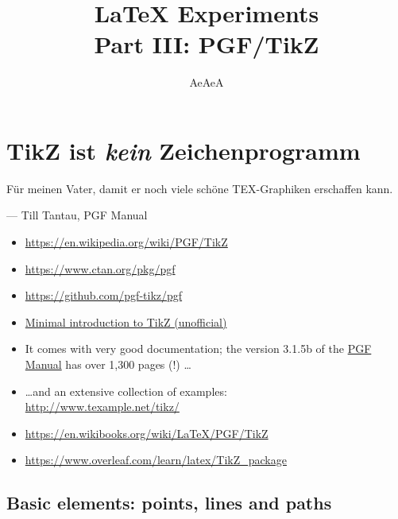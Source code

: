 \documentclass[]{article}
\title{\LaTeX{} Experiments\\ Part III: PGF/TikZ}
\author{AeAeA}
\begin{document}
\maketitle

\vspace{20pt}

\begin{figure}[h] \centering
\end{figure}

\section{TikZ ist {\itshape kein} Zeichenprogramm}

\epigraph
{Für meinen Vater, damit er noch viele schöne TEX-Graphiken erschaffen kann.}
{--- \textup{Till Tantau}, PGF Manual}

\begin{itemize}
    \item \url{https://en.wikipedia.org/wiki/PGF/TikZ}
    \item \url{https://www.ctan.org/pkg/pgf}
    \item \url{https://github.com/pgf-tikz/pgf}
    \item \href{http://cremeronline.com/LaTeX/minimaltikz.pdf}
               {Minimal introduction to TikZ (unofficial)}
    \item  It comes with very good documentation; the version 3.1.5b of the 
           \href{http://mirrors.ctan.org/graphics/pgf/base/doc/pgfmanual.pdf}
                {PGF Manual} has over 1,300 pages (!) \ldots
    \item \ldots and an extensive collection of examples: \\
          \url{http://www.texample.net/tikz/}
    \item \url{https://en.wikibooks.org/wiki/LaTeX/PGF/TikZ}
    \item \url{https://www.overleaf.com/learn/latex/TikZ_package}
\end{itemize}



\subsection{Basic elements: points, lines and paths}
\end{document}
